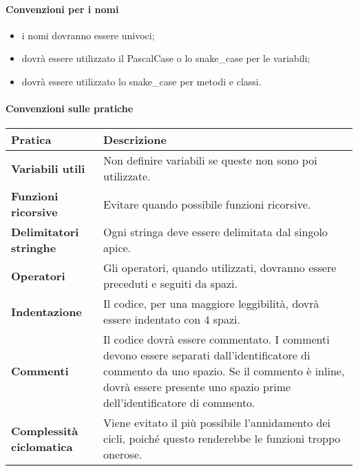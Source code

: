     \paragraph{Convenzioni per i nomi} 
    \begin{itemize}
        \item i nomi dovranno essere univoci;
        \item dovrà essere utilizzato il PascalCase o lo snake\_case per le variabili;
        \item dovrà essere utilizzato lo snake\_case per metodi e classi. 
    \end{itemize}
        
    \paragraph{Convenzioni sulle pratiche} \hfill \break
\newline
    \begin{tabular}{ |m{15em}|m{25em}| }
        \hline
        \textbf{Pratica}			    & \textbf{Descrizione}\\
        \hline
        \textbf{Variabili utili}		& Non definire variabili se queste non sono poi utilizzate.\\
        \hline
        \textbf{Funzioni ricorsive}		& Evitare quando possibile funzioni ricorsive.\\
        \hline
        \textbf{Delimitatori stringhe}	& Ogni stringa deve essere delimitata dal singolo apice.\\
        \hline
        \textbf{Operatori}			    & Gli operatori, quando utilizzati, dovranno essere preceduti e seguiti da spazi.\\
        \hline
        \textbf{Indentazione}			& Il codice, per una maggiore leggibilità, dovrà essere indentato con 4 spazi.\\ %
        \hline
        \textbf{Commenti}			    & Il codice dovrà essere commentato. I commenti devono essere separati dall'identificatore di commento da uno spazio. Se il commento è inline, dovrà essere presente uno spazio prime dell'identificatore di commento.\\
        \hline
        \textbf{Complessità ciclomatica}& Viene evitato il più possibile l'annidamento dei cicli, poiché questo renderebbe le funzioni troppo onerose.\\
        \hline
\end{tabular}
    

